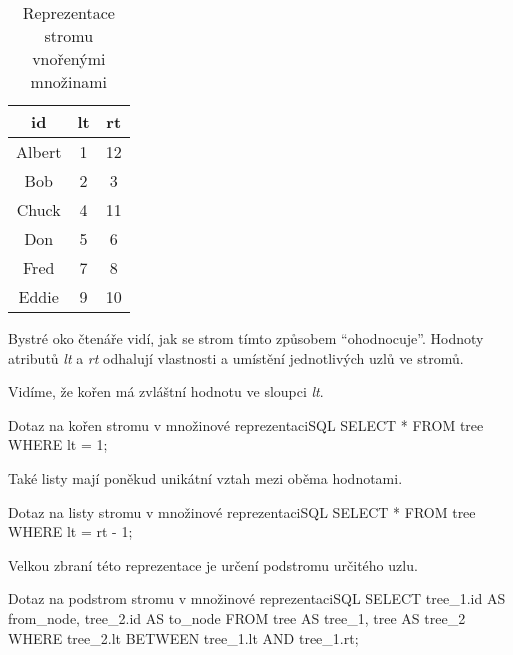 \begin{table}
\centering
\caption{Reprezentace stromu vnořenými množinami}\label{tab:str3}
\begin{tabular}{c | c c}
id & lt & rt \\
\hline
Albert & 1 & 12 \\
Bob & 2 & 3 \\
Chuck & 4 & 11 \\
Don & 5 & 6 \\
Fred & 7 & 8 \\
Eddie & 9 & 10
\end{tabular}
\end{table}

Bystré oko čtenáře vidí, jak se strom tímto způsobem \enquote{ohodnocuje}. Hodnoty atributů \textit{lt} a \textit{rt} odhalují vlastnosti a umístění jednotlivých uzlů ve stromů.

\begin{upexample}
Vidíme, že kořen má zvláštní hodnotu ve sloupci \textit{lt}.

\begin{upcode}{Dotaz na kořen stromu v množinové reprezentaci}{}{SQL}
SELECT * FROM tree WHERE lt = 1;
\end{upcode}

Také listy mají poněkud unikátní vztah mezi oběma hodnotami.
\begin{upcode}{Dotaz na listy stromu v množinové reprezentaci}{}{SQL}
SELECT * FROM tree WHERE lt = rt - 1;
\end{upcode}

Velkou zbraní této reprezentace je určení podstromu určitého uzlu.
\begin{upcode}{Dotaz na podstrom stromu v množinové reprezentaci}{}{SQL}
SELECT	tree_1.id AS from_node, tree_2.id AS to_node
FROM	tree AS tree_1, tree AS tree_2
WHERE	tree_2.lt BETWEEN tree_1.lt AND tree_1.rt;
\end{upcode}
\end{upexample}

